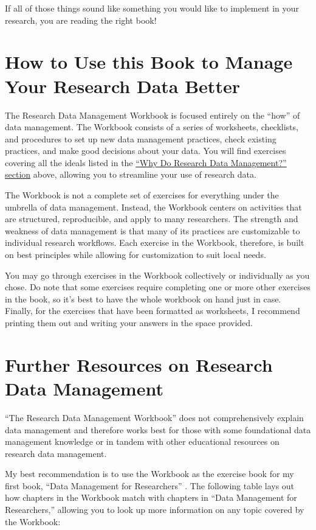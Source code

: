 \documentclass[
]{book}
\begin{document}
If all of those things sound like something you would like to implement in your research, you are reading the right book!

\hypertarget{how-rdm}{%
\section{How to Use this Book to Manage Your Research Data Better}\label{how-rdm}}

The Research Data Management Workbook is focused entirely on the ``how'' of data management. The Workbook consists of a series of worksheets, checklists, and procedures to set up new data management practices, check existing practices, and make good decisions about your data. You will find exercises covering all the ideals listed in the \protect\hyperlink{why-rdm}{``Why Do Research Data Management?'' section} above, allowing you to streamline your use of research data.

The Workbook is not a complete set of exercises for everything under the umbrella of data management. Instead, the Workbook centers on activities that are structured, reproducible, and apply to many researchers. The strength and weakness of data management is that many of its practices are customizable to individual research workflows. Each exercise in the Workbook, therefore, is built on best principles while allowing for customization to suit local needs.

You may go through exercises in the Workbook collectively or individually as you chose. Do note that some exercises require completing one or more other exercises in the book, so it's best to have the whole workbook on hand just in case. Finally, for the exercises that have been formatted as worksheets, I recommend printing them out and writing your answers in the space provided.

\hypertarget{more-rdm}{%
\section{Further Resources on Research Data Management}\label{more-rdm}}

``The Research Data Management Workbook'' does not comprehensively explain data management and therefore works best for those with some foundational data management knowledge or in tandem with other educational resources on research data management.

My best recommendation is to use the Workbook as the exercise book for my first book, ``Data Management for Researchers'' \citep{briney_data_2015}. The following table lays out how chapters in the Workbook match with chapters in ``Data Management for Researchers,'' allowing you to look up more information on any topic covered by the Workbook:
\end{document}
